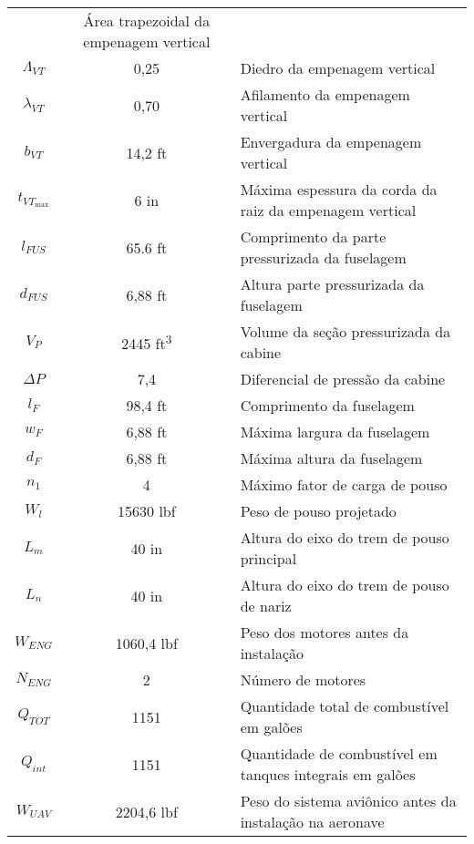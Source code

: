 \begin{table}[h]
\begin{tabular}{ccl}
				& Área trapezoidal da empenagem vertical
			\\
			$ \Lambda_{VT} $
				& 0,25
				& Diedro da empenagem vertical
			\\
			$ \lambda_{VT} $
				& 0,70
				& Afilamento da empenagem vertical
			\\
			$ b_{VT} $
				& 14,2 \si{ft}
				& Envergadura da empenagem vertical
			\\
			$ t_{VT_{\max}} $
				& 6 \si{in}
				& Máxima espessura da corda da raiz da empenagem vertical
			\\
			$ l_{FUS} $
				& 65.6 \si{ft}
				& Comprimento da parte pressurizada da fuselagem
			\\
			$ d_{FUS} $
				& 6,88 \si{ft}
				& Altura parte pressurizada da fuselagem
			\\
			$ V_P $
				& 2445 \si{ft^3}
				& Volume da seção pressurizada da cabine
			\\
			$ \Delta P $
				& 7,4
				& Diferencial de pressão da cabine
			\\
			$ l_F $
				& 98,4 \si{ft}
				& Comprimento da fuselagem
			\\
			$ w_F $
				& 6,88 \si{ft}
				& Máxima largura da fuselagem
			\\
			$ d_F $
				& 6,88 \si{ft}
				& Máxima altura da fuselagem
			\\
			$ n_1 $
				& 4
				& Máximo fator de carga de pouso
			\\
			$ W_l $
				& 15630 \si{lbf}
				& Peso de pouso projetado
			\\
			$ L_m $
				& 40 \si{in}
				& Altura do eixo do trem de pouso principal
			\\
			$ L_n $
				& 40 \si{in}
				& Altura do eixo do trem de pouso de nariz
			\\
			$ W_{ENG} $
				& 1060,4 \si{lbf}
				& Peso dos motores antes da instalação
			\\
			$ N_{ENG} $
				& 2
				& Número de motores
			\\
			$ Q_{TOT} $
				& 1151
				& Quantidade total de combustível em galões
			\\
			$ Q_{int} $
				& 1151
				& Quantidade de combustível em tanques integrais em galões
			\\
			$ W_{UAV} $
				& 2204,6 \si{lbf}
				& Peso do sistema aviônico antes da instalação na aeronave
			\\ \hline
    \end{tabular}
  \end{table}

